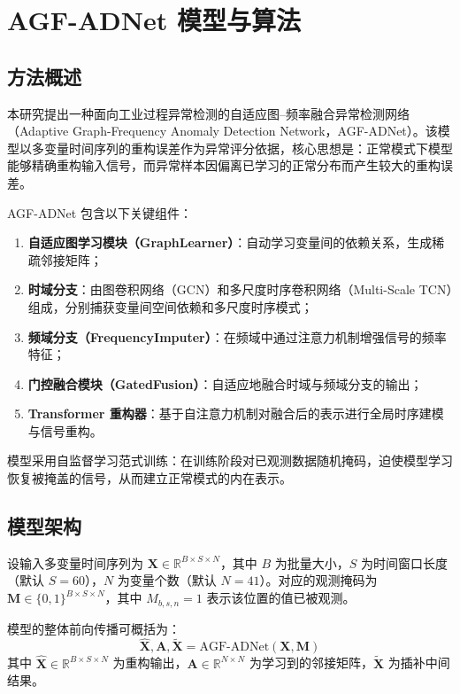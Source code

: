 \documentclass[UTF8]{ctexart}
\begin{document}
\section{AGF-ADNet 模型与算法}

\subsection{方法概述}

本研究提出一种面向工业过程异常检测的自适应图--频率融合异常检测网络（Adaptive Graph-Frequency Anomaly Detection Network，AGF-ADNet）。该模型以多变量时间序列的重构误差作为异常评分依据，核心思想是：正常模式下模型能够精确重构输入信号，而异常样本因偏离已学习的正常分布而产生较大的重构误差。

AGF-ADNet 包含以下关键组件：
\begin{enumerate}
    \item \textbf{自适应图学习模块（GraphLearner）}：自动学习变量间的依赖关系，生成稀疏邻接矩阵；
    \item \textbf{时域分支}：由图卷积网络（GCN）和多尺度时序卷积网络（Multi-Scale TCN）组成，分别捕获变量间空间依赖和多尺度时序模式；
    \item \textbf{频域分支（FrequencyImputer）}：在频域中通过注意力机制增强信号的频率特征；
    \item \textbf{门控融合模块（GatedFusion）}：自适应地融合时域与频域分支的输出；
    \item \textbf{Transformer 重构器}：基于自注意力机制对融合后的表示进行全局时序建模与信号重构。
\end{enumerate}

模型采用自监督学习范式训练：在训练阶段对已观测数据随机掩码，迫使模型学习恢复被掩盖的信号，从而建立正常模式的内在表示。

\subsection{模型架构}

设输入多变量时间序列为 $\mathbf{X} \in \mathbb{R}^{B \times S \times N}$，其中 $B$ 为批量大小，$S$ 为时间窗口长度（默认 $S=60$），$N$ 为变量个数（默认 $N=41$）。对应的观测掩码为 $\mathbf{M} \in \{0,1\}^{B \times S \times N}$，其中 $M_{b,s,n}=1$ 表示该位置的值已被观测。

模型的整体前向传播可概括为：
\begin{equation}
    \hat{\mathbf{X}}, \mathbf{A}, \tilde{\mathbf{X}} = \mathrm{AGF\text{-}ADNet}(\mathbf{X}, \mathbf{M})
\end{equation}
其中 $\hat{\mathbf{X}} \in \mathbb{R}^{B \times S \times N}$ 为重构输出，$\mathbf{A} \in \mathbb{R}^{N \times N}$ 为学习到的邻接矩阵，$\tilde{\mathbf{X}}$ 为插补中间结果。
\end{document}
